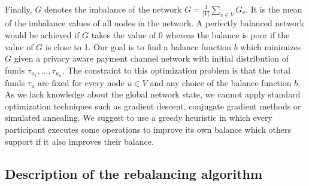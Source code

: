 \documentclass[conference]{IEEEtran}
\begin{document}
Finally, $G$ denotes the imbalance of the network $G = \displaystyle{\frac{1}{|V|}\sum_{v\in V}G_v}$. It is the mean of the imbalance values of all nodes in the network.
A perfectly balanced network would be achieved if $G$ takes the value of $0$ whereas the balance is poor if the value of $G$ is close to 1.
Our goal is to find a balance function $b$ which minimizes $G$ given a privacy aware payment channel network with initial distribution of funds $\tau_{u_1},\dots,\tau_{u_n}$.
The constraint to this optimization problem is that the total funds $\tau_u$ are fixed for every node $u \in V$ and any choice of the balance function $b$.
As we lack knowledge about the global network state, we cannot apply standard optimization techniques such as gradient descent, conjugate gradient methods or simulated annealing.
We suggest to use a greedy heuristic in which every participant executes some operations to improve its own balance which others support if it also improves their balance.

\subsection{Description of the rebalancing algorithm}
\label{sec:Greedy Rebalancing Heuristic}
\end{document}
